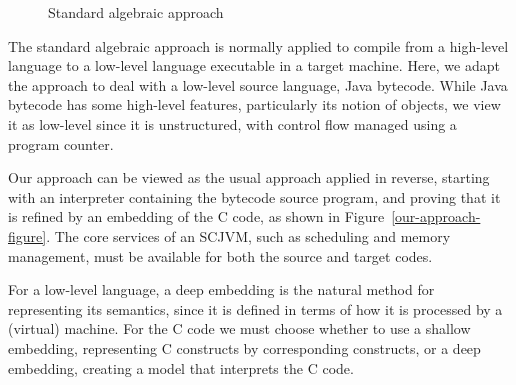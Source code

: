 \begin{figure}
  \centering
  \caption{Standard algebraic approach}
  \label{algebraic-approach-figure}
\end{figure}

The standard algebraic approach is normally applied to compile from a
high-level language to a low-level language executable in a target
machine.
Here, we adapt the approach to deal with a low-level source language,
Java bytecode.
While Java bytecode has some high-level features, particularly its
notion of objects, we view it as low-level since it is unstructured,
with control flow managed using a program counter.

Our approach can be viewed as the usual approach applied in reverse,
starting with an interpreter containing the bytecode source program,
and proving that it is refined by an embedding of the C code, as shown
in Figure~\ref{our-approach-figure}.
The core services of an SCJVM, such as scheduling and memory
management, must be available for both the source and target codes.

For a low-level language, a deep embedding is the
natural method for representing its semantics, since it is defined in
terms of how it is processed by a (virtual) machine.
For the C code we must choose whether to use a shallow embedding,
representing C constructs by corresponding \Circus{} constructs, or a
deep embedding, creating a \Circus{} model that interprets the C
code.

